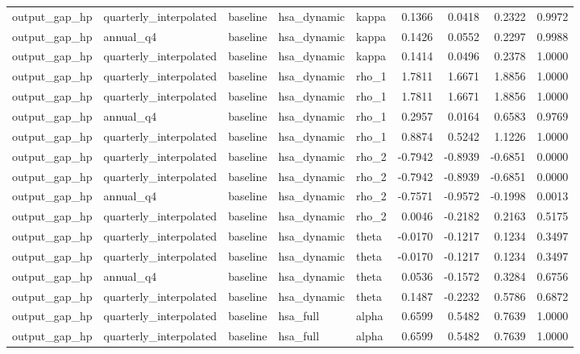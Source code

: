 \begin{tabular}{lllllrrrr}
output\_gap\_hp & quarterly\_interpolated & baseline & hsa\_dynamic & kappa & 0.1366 & 0.0418 & 0.2322 & 0.9972 \\
output\_gap\_hp & annual\_q4 & baseline & hsa\_dynamic & kappa & 0.1426 & 0.0552 & 0.2297 & 0.9988 \\
output\_gap\_hp & quarterly\_interpolated & baseline & hsa\_dynamic & kappa & 0.1414 & 0.0496 & 0.2378 & 1.0000 \\
output\_gap\_hp & quarterly\_interpolated & baseline & hsa\_dynamic & rho\_1 & 1.7811 & 1.6671 & 1.8856 & 1.0000 \\
output\_gap\_hp & quarterly\_interpolated & baseline & hsa\_dynamic & rho\_1 & 1.7811 & 1.6671 & 1.8856 & 1.0000 \\
output\_gap\_hp & annual\_q4 & baseline & hsa\_dynamic & rho\_1 & 0.2957 & 0.0164 & 0.6583 & 0.9769 \\
output\_gap\_hp & quarterly\_interpolated & baseline & hsa\_dynamic & rho\_1 & 0.8874 & 0.5242 & 1.1226 & 1.0000 \\
output\_gap\_hp & quarterly\_interpolated & baseline & hsa\_dynamic & rho\_2 & -0.7942 & -0.8939 & -0.6851 & 0.0000 \\
output\_gap\_hp & quarterly\_interpolated & baseline & hsa\_dynamic & rho\_2 & -0.7942 & -0.8939 & -0.6851 & 0.0000 \\
output\_gap\_hp & annual\_q4 & baseline & hsa\_dynamic & rho\_2 & -0.7571 & -0.9572 & -0.1998 & 0.0013 \\
output\_gap\_hp & quarterly\_interpolated & baseline & hsa\_dynamic & rho\_2 & 0.0046 & -0.2182 & 0.2163 & 0.5175 \\
output\_gap\_hp & quarterly\_interpolated & baseline & hsa\_dynamic & theta & -0.0170 & -0.1217 & 0.1234 & 0.3497 \\
output\_gap\_hp & quarterly\_interpolated & baseline & hsa\_dynamic & theta & -0.0170 & -0.1217 & 0.1234 & 0.3497 \\
output\_gap\_hp & annual\_q4 & baseline & hsa\_dynamic & theta & 0.0536 & -0.1572 & 0.3284 & 0.6756 \\
output\_gap\_hp & quarterly\_interpolated & baseline & hsa\_dynamic & theta & 0.1487 & -0.2232 & 0.5786 & 0.6872 \\
output\_gap\_hp & quarterly\_interpolated & baseline & hsa\_full & alpha & 0.6599 & 0.5482 & 0.7639 & 1.0000 \\
output\_gap\_hp & quarterly\_interpolated & baseline & hsa\_full & alpha & 0.6599 & 0.5482 & 0.7639 & 1.0000 \\

\end{tabular}
